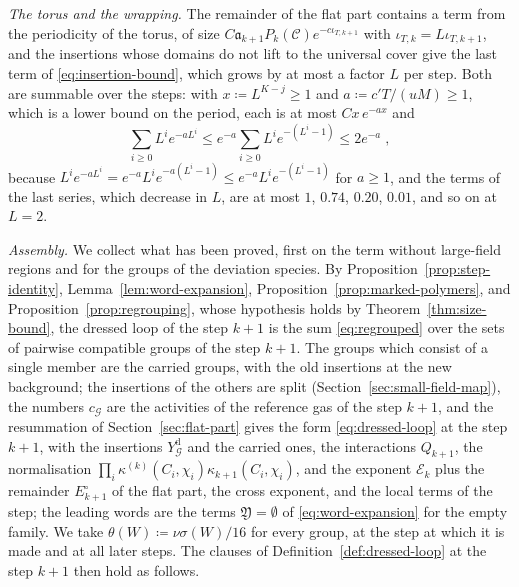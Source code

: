 \documentclass[11pt]{preprint}
\numberwithin{equation}{section}
\theoremstyle{definition}
\theoremstyle{remark}
\theoremstyle{plain}
\begin{document}
\emph{The torus and the wrapping.} The remainder of the flat part contains a term from the periodicity of the torus, of size $C\mathfrak a_{k+1}P_k(\mathcal C)e^{-c\iota_{T,k+1}}$ with $\iota_{T,k} = L\iota_{T,k+1}$, and the insertions whose domains do not lift to the universal cover give the last term of \eqref{eq:insertion-bound}, which grows by at most a factor $L$ per step. Both are summable over the steps: with $x \coloneqq L^{K-j} \geq 1$ and $a \coloneqq c'T/(uM) \geq 1$, which is a lower bound on the period, each is at most $Cx\,e^{-ax}$ and
\begin{equation}\label{eq:wrap-sum}
    \sum_{i \geq 0}L^ie^{-aL^i} \leq e^{-a}\sum_{i \geq 0}L^ie^{-(L^i - 1)} \leq 2e^{-a}\;,
\end{equation}
because $L^ie^{-aL^i} = e^{-a}L^ie^{-a(L^i - 1)} \leq e^{-a}L^ie^{-(L^i - 1)}$ for $a \geq 1$, and the terms of the last series, which decrease in $L$, are at most $1$, $0.74$, $0.20$, $0.01$, and so on at $L = 2$.

\emph{Assembly.} We collect what has been proved, first on the term without large-field regions and for the groups of the deviation species. By Proposition~\ref{prop:step-identity}, Lemma~\ref{lem:word-expansion}, Proposition~\ref{prop:marked-polymers}, and Proposition~\ref{prop:regrouping}, whose hypothesis holds by Theorem~\ref{thm:size-bound}, the dressed loop of the step $k + 1$ is the sum \eqref{eq:regrouped} over the sets of pairwise compatible groups of the step $k + 1$. The groups which consist of a single member are the carried groups, with the old insertions at the new background; the insertions of the others are split (Section~\ref{sec:small-field-map}), the numbers $c_{\mathcal G}$ are the activities of the reference gas of the step $k + 1$, and the resummation of Section~\ref{sec:flat-part} gives the form \eqref{eq:dressed-loop} at the step $k + 1$, with the insertions $Y^{\mathrm d}_{\mathcal G}$ and the carried ones, the interactions $Q_{k+1}$, the normalisation $\prod_i\kappa^{(k)}(C_i, \chi_i)\kappa_{k+1}(C_i, \chi_i)$, and the exponent $\mathcal E_k$ plus the remainder $E^\circ_{k+1}$ of the flat part, the cross exponent, and the local terms of the step; the leading words are the terms $\mathfrak Y = \emptyset$ of \eqref{eq:word-expansion} for the empty family. We take $\theta(W) \coloneqq \nu\sigma(W)/16$ for every group, at the step at which it is made and at all later steps. The clauses of Definition~\ref{def:dressed-loop} at the step $k + 1$ then hold as follows.
\end{document}
